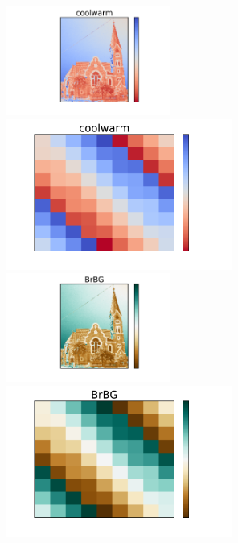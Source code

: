 \documentclass{beamer}
\begin{document}
\begin{frame}
\begin{columns}
\begin{column}{0.5\textwidth}
\end{column}
\begin{column}{0.5\textwidth}
\begin{center}
\vfill
\includegraphics[width=0.42\textwidth]{church_coolwarm.pdf}
\includegraphics[width=0.58\textwidth]{magicsquare_coolwarm.pdf}\newline\newline
\vfill
\includegraphics[width=0.42\textwidth]{church_BrBG.pdf}
\includegraphics[width=0.58\textwidth]{magicsquare_BrBG.pdf}
\vfill
\end{center}
\end{column}
\end{columns}
\end{frame}
\end{document}
